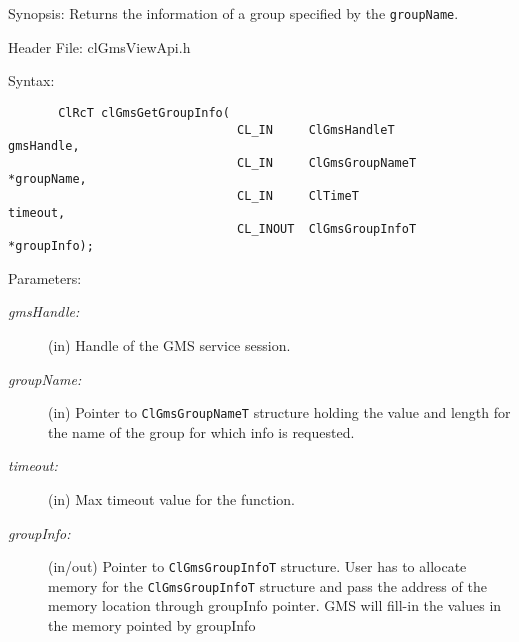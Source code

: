 \begin{flushleft}
\begin{Desc}

\item[Synopsis:]
  Returns the information of a group specified by the {\tt{groupName}}.\end{Desc}

\begin{Desc}
  \item[Header File:]
  clGmsViewApi.h\end{Desc}

  \begin{Desc}
  \item[Syntax:]
  \footnotesize\begin{verbatim}       ClRcT clGmsGetGroupInfo(
                           		CL_IN     ClGmsHandleT             gmsHandle,
                           		CL_IN     ClGmsGroupNameT         *groupName,
                           		CL_IN     ClTimeT                  timeout,
                           		CL_INOUT  ClGmsGroupInfoT         *groupInfo);
 \end{verbatim}
  \normalsize
  \end{Desc}

 \begin{Desc}
\item[Parameters:]
\begin{description}
  \item[{\em gmsHandle:}] (in) Handle of the GMS service session.
  \item[{\em groupName:}] (in) Pointer to {\tt{ClGmsGroupNameT}} structure holding the value and
                    length for the name of the group for which info is requested.
  \item[{\em timeout:}] (in) Max timeout value for the function.
  \item[{\em groupInfo:}] (in/out) Pointer to {\tt{ClGmsGroupInfoT}} structure. User has to allocate
                    memory for the {\tt{ClGmsGroupInfoT}} structure and pass the
                    address of the memory location through groupInfo pointer.
                    GMS will fill-in the values in the memory pointed by groupInfo
\end{description}
\end{Desc}


\end{flushleft}
